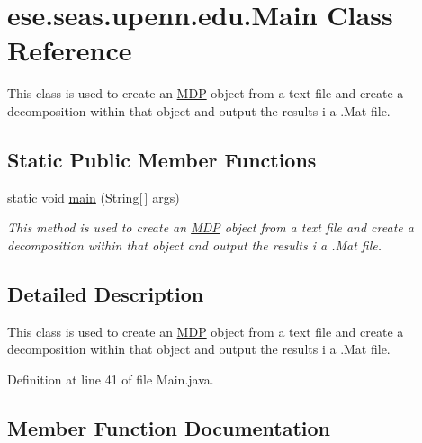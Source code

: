 \hypertarget{classese_1_1seas_1_1upenn_1_1edu_1_1_main}{}\section{ese.\+seas.\+upenn.\+edu.\+Main Class Reference}
\label{classese_1_1seas_1_1upenn_1_1edu_1_1_main}


This class is used to create an \hyperlink{classese_1_1seas_1_1upenn_1_1edu_1_1_m_d_p}{M\+D\+P} object from a text file and create a decomposition within that object and output the results i a .Mat file.  


\subsection*{Static Public Member Functions}
\begin{DoxyCompactItemize}
\item 
static void \hyperlink{classese_1_1seas_1_1upenn_1_1edu_1_1_main_a88eabca25558235b5b46c105c11ca794}{main} (String\mbox{[}$\,$\mbox{]} args)
\begin{DoxyCompactList}\small\item\em This method is used to create an \hyperlink{classese_1_1seas_1_1upenn_1_1edu_1_1_m_d_p}{M\+D\+P} object from a text file and create a decomposition within that object and output the results i a .Mat file. \end{DoxyCompactList}\end{DoxyCompactItemize}


\subsection{Detailed Description}
This class is used to create an \hyperlink{classese_1_1seas_1_1upenn_1_1edu_1_1_m_d_p}{M\+D\+P} object from a text file and create a decomposition within that object and output the results i a .Mat file. 

Definition at line 41 of file Main.\+java.



\subsection{Member Function Documentation}
\hypertarget{classese_1_1seas_1_1upenn_1_1edu_1_1_main_a88eabca25558235b5b46c105c11ca794}{}
